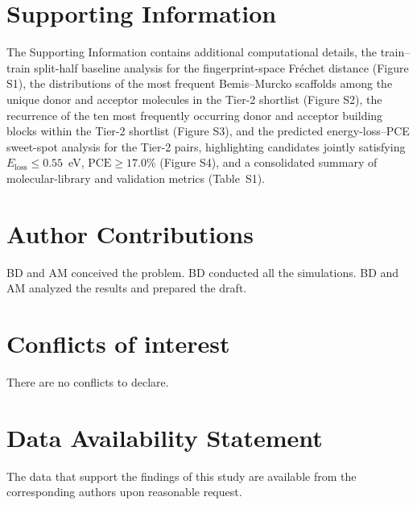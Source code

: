 \documentclass[12pt]{article}
\begin{document}
\section{Supporting Information}
The Supporting Information contains additional computational details, the train--train split-half baseline analysis for the fingerprint-space Fréchet distance (Figure S1), the distributions of the most frequent Bemis--Murcko scaffolds among the unique donor and acceptor molecules in the Tier-2 shortlist (Figure S2), the recurrence of the ten most frequently occurring donor and acceptor building blocks within the Tier-2 shortlist (Figure S3), and the predicted energy-loss--PCE sweet-spot analysis for the Tier-2 pairs, highlighting candidates jointly satisfying $E_{\mathrm{loss}}\leq0.55$~eV, $\mathrm{PCE}\geq17.0\%$ (Figure S4), and a consolidated summary of molecular-library and validation metrics (Table~S1).


\section*{Author Contributions}
BD and AM conceived the problem. BD conducted all the simulations. BD and AM analyzed the results and prepared the draft.

\section*{Conflicts of interest}
There are no conflicts to declare.

\section*{Data Availability Statement} 
The data that support the findings of this study are available from the corresponding authors upon reasonable request.

\clearpage




\vspace{1em}

\end{document}
